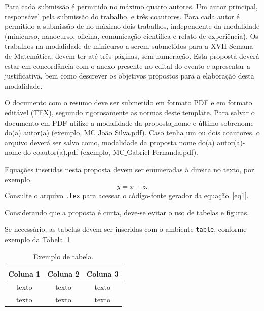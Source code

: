 \documentclass{semat}
\begin{document}
Para cada submissão é permitido no máximo quatro autores. Um autor principal, responsável pela submissão do trabalho, e três coautores. Para cada autor é permitido a submissão de no máximo dois trabalhos, independente da modalidade (minicurso, nanocurso, oficina, comunicação científica e relato de experiência). Os trabalhos na modalidade de minicurso a serem submetidos para a XVII Semana de Matemática, devem ter até três páginas, sem numeração. Esta proposta deverá estar em concordância com o anexo presente no edital do evento e apresentar a justificativa, bem como descrever os objetivos propostos para a elaboração desta modalidade. 

O documento com o resumo deve ser submetido em formato PDF e em formato editável (TEX),  seguindo rigorosamente as normas deste template. Para salvar o documento em PDF utilize a modalidade da proposta$\_$nome e último sobrenome do(a) autor(a) (exemplo, MC$\_$João Silva.pdf). Caso tenha um ou dois coautores, o arquivo deverá ser salvo como, modalidade da proposta$\_$nome do(a) autor(a)-nome do coautor(a).pdf (exemplo, MC$\_$Gabriel-Fernanda.pdf).

Equações inseridas nesta proposta devem ser enumeradas à direita no texto, por exemplo,
\begin{equation}
y = x + z.
\label{eq1}
\end{equation}
Consulte o arquivo \verb!.tex! para acessar o código-fonte gerador da equação~\eqref{eq1}.

Considerando que a proposta é curta, deve-se evitar o uso de tabelas e figuras. 

Se necessário, as tabelas devem ser inseridas com o ambiente \verb!table!, conforme exemplo da Tabela~\ref{tabela01}.

\begin{table}[H]
\caption{{\small Exemplo de tabela.}}
\centering
\begin{tabular}{ccc}
\hline
Coluna 1  & Coluna 2 & Coluna 3\\ \hline
texto   & texto   & texto    \\
texto   & texto   & texto \\
\hline
\end{tabular}\label{tabela01}
\end{table}
\end{document}
